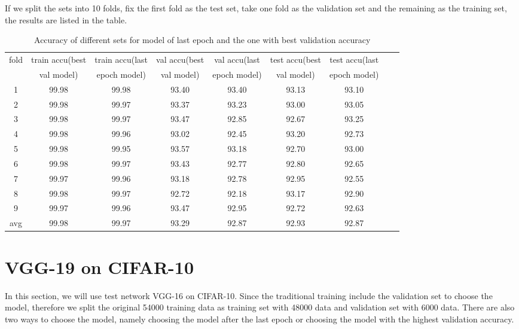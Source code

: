 If we split the sets into 10 folds, fix the first fold as the test set, take one fold as the validation set and the remaining as the training set, the results are listed in the table.
\begin{table}[!htbp]
	\centering
	\caption{Accuracy of different sets for model of last epoch and the one with best validation accuracy }
	\label{table:cv1}
	\begin{tabular}{|c|c|c|c|c|c|c|c|c|}
		\hline
%		
fold	&	train accu(best	&	train accu(last	&	val accu(best	&	val accu(last	&	test accu(best 	&	test accu(last	\\
	&	 val model)	&	 epoch model)	&	val model)	&	 epoch model)	&	val model)	&	 epoch model)	\\\hline
1	&	99.98	&	99.98	&	93.40	&	93.40	&	93.13	&	93.10	\\\hline
2	&	99.98	&	99.97	&	93.37	&	93.23	&	93.00	&	93.05	\\\hline
3	&	99.98	&	99.97	&	93.47	&	92.85	&	92.67	&	93.25	\\\hline
4	&	99.98	&	99.96	&	93.02	&	92.45	&	93.20	&	92.73	\\\hline
5	&	99.98	&	99.95	&	93.57	&	93.18	&	92.70	&	93.00	\\\hline
6	&	99.98	&	99.97	&	93.43	&	92.77	&	92.80	&	92.65	\\\hline
7	&	99.97	&	99.96	&	93.18	&	92.78	&	92.95	&	92.55	\\\hline
8	&	99.98	&	99.97	&	92.72	&	92.18	&	93.17	&	92.90	\\\hline
9	&	99.97	&	99.96	&	93.47	&	92.95	&	92.72	&	92.63	\\\hline
avg	&	99.98	&	99.97	&	93.29	&	92.87	&	92.93	&	92.87	\\\hline
	\end{tabular}
\end{table}

\newpage
\section{VGG-19 on CIFAR-10}
In this section, we will use test network VGG-16 on CIFAR-10. Since the traditional training include the validation set to choose the model, therefore we split the original 54000 training data as training set with 48000 data and validation set with 6000 data. There are also two ways to choose the model, namely choosing the model after the last epoch or choosing the model with the highest validation accuracy. 


